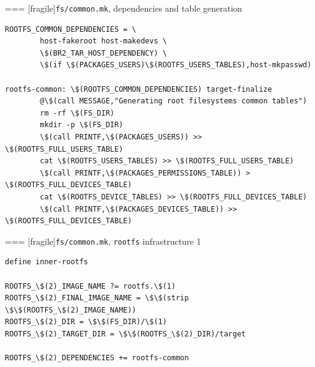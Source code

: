 === [fragile]{{\tt fs/common.mk}, dependencies and table generation}
  \begin{block}{}
\begin{verbatim}
ROOTFS_COMMON_DEPENDENCIES = \
        host-fakeroot host-makedevs \
        \$(BR2_TAR_HOST_DEPENDENCY) \
        \$(if \$(PACKAGES_USERS)\$(ROOTFS_USERS_TABLES),host-mkpasswd)

rootfs-common: \$(ROOTFS_COMMON_DEPENDENCIES) target-finalize
        @\$(call MESSAGE,"Generating root filesystems common tables")
        rm -rf \$(FS_DIR)
        mkdir -p \$(FS_DIR)
        \$(call PRINTF,\$(PACKAGES_USERS)) >> \$(ROOTFS_FULL_USERS_TABLE)
        cat \$(ROOTFS_USERS_TABLES) >> \$(ROOTFS_FULL_USERS_TABLE)
        \$(call PRINTF,\$(PACKAGES_PERMISSIONS_TABLE)) > \$(ROOTFS_FULL_DEVICES_TABLE)
        cat \$(ROOTFS_DEVICE_TABLES) >> \$(ROOTFS_FULL_DEVICES_TABLE)
        \$(call PRINTF,\$(PACKAGES_DEVICES_TABLE)) >> \$(ROOTFS_FULL_DEVICES_TABLE)
\end{verbatim}
  \end{block}


=== [fragile]{{\tt fs/common.mk}, {\tt rootfs} infrastructure 1}
  \begin{block}{}
\begin{verbatim}
define inner-rootfs

ROOTFS_\$(2)_IMAGE_NAME ?= rootfs.\$(1)
ROOTFS_\$(2)_FINAL_IMAGE_NAME = \$\$(strip \$\$(ROOTFS_\$(2)_IMAGE_NAME))
ROOTFS_\$(2)_DIR = \$\$(FS_DIR)/\$(1)
ROOTFS_\$(2)_TARGET_DIR = \$\$(ROOTFS_\$(2)_DIR)/target

ROOTFS_\$(2)_DEPENDENCIES += rootfs-common
\end{verbatim}
  \end{block}


